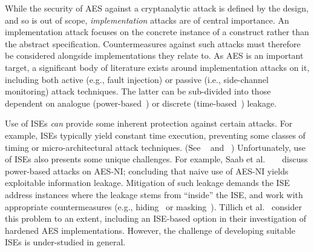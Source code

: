 
While the security of AES against a cryptanalytic attack is defined by
the design, and so is out of scope, {\em implementation} attacks are
of central importance.
An implementation attack focuses on the concrete instance of a construct
rather than the abstract specification.
Countermeasures against such attacks must therefore be
considered alongside implementations they relate to.
As AES is an important target, a significant body of literature exists
around implementation attacks on it, including both
 active (e.g., fault injection)
or
passive (i.e., side-channel monitoring)
attack techniques.
The latter can be sub-divided into those dependent on
analogue
(power-based~\cite{ManOswPop:07})
or
discrete 
(time-based~\cite{KoeQui:99})
leakage.

Use of ISEs
{\em can} provide some inherent protection against certain attacks.
For example,
ISEs typically yield constant time execution,
preventing some classes of timing or micro-architectural
attack techniques.
(See ~\cite[Section 4]{Szefer:19} and ~\cite[Section 4]{GYCH:18})
Unfortunately,
use of ISEs also presents some unique challenges.
For example, 
Saab et al. ~ ~\cite{SaaRohHam:16}
discuss power-based attacks on AES-NI; concluding
that naive use of AES-NI yields exploitable information leakage.
Mitigation of such leakage demands the ISE
address instances where the leakage stems from ``inside'' the ISE,
and work with appropriate countermeasures
(e.g., hiding~\cite[Chapter 7]{ManOswPop:07} or masking~\cite[Chapter 10]{ManOswPop:07}).
Tillich et al.~\cite{TilHerMan:07}
consider this problem to an extent, including an ISE-based option in
their investigation of hardened AES implementations. However, the challenge
of developing suitable ISEs is under-studied in general.

